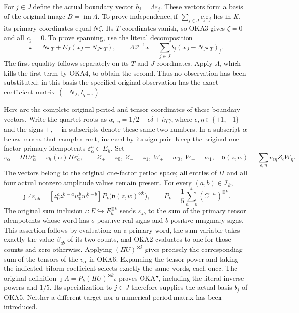 \documentclass[11pt,a4paper]{article}
\begin{document}
For $j\in J$ define the actual boundary vector
$b_j=\Lambda\varepsilon_j$. These vectors form a basis of
the original image $B=\operatorname{im}\Lambda$. To prove
independence, if $\sum_{j\in J}c_j\varepsilon_j$ lies in
$K$, its primary coordinates equal $N\zeta$. Its $T$
coordinates vanish, so OKA3 gives $\zeta=0$ and all $c_j=0$.
To prove spanning, use the literal decomposition
\[
 x=N x_T+E_J(x_J-N_Jx_T),\qquad
 \Lambda\mathcal V^{-1}x
       =\sum_{j\in J}b_j(x_J-N_Jx_T)_j.
 \tag{OKA5}
\]
The first equality follows separately on its $T$ and $J$
coordinates. Apply $\Lambda$, which kills the first term by
OKA4, to obtain the second. Thus no observation has been
substituted: in this basis the specified original observation
has the exact coefficient matrix $(-N_J,I_{q-r})$.

Here are the complete original period and tensor coordinates of
these boundary vectors. Write the quartet roots as
$\alpha_{\epsilon,\eta}=1/2+\epsilon\delta+i\eta\gamma$,
where $\epsilon,\eta\in\{+1,-1\}$ and the signs $+,-$ in
subscripts denote these same two numbers. In a subscript
$\alpha$ below means that complex root, indexed by its sign
pair. Keep the original one-factor primary idempotents
$\varepsilon^h_\alpha\in E_h$. Set
\[
 v_\alpha=\Pi U\varepsilon^h_\alpha
       =v_h(\alpha)\Pi\varepsilon^h_\alpha,
 \qquad
 Z_+=z_0,\ Z_-=z_1,\ W_+=w_0,\ W_-=w_1,
 \quad
 \mathfrak v(z,w)=\sum_{\epsilon,\eta}
                         v_{\epsilon\eta}Z_\epsilon W_\eta.
 \tag{OKA6}
\]
The vectors belong to the original one-factor period space;
all entries of $\Pi$ and all four actual nonzero amplitude
values remain present. For every $(a,b)\in\mathcal I_k$,
\[
 \boxed{\quad
 \jmath\Lambda\varepsilon_{ab}
  =[z_0^a z_1^{k-a}w_0^b w_1^{k-b}]
       P_k\bigl(\mathfrak v(z,w)^{\otimes k}\bigr),\qquad
 P_k=\frac15\sum_{h=0}^4(C^{-h})^{\otimes k}.
 \quad}\tag{OKA7}
\]
The original sum inclusion $\iota:E\hookrightarrow E_h^{\otimes k}$
sends $\varepsilon_{ab}$ to the sum of the primary tensor
idempotents whose word has $a$ positive real signs and $b$
positive imaginary signs. This assertion follows by evaluation:
on a primary word, the sum variable takes exactly the value
$\beta_{ab}$ of its two counts, and OKA2 evaluates to one
for those counts and zero otherwise. Applying
$(\Pi U)^{\otimes k}$ gives precisely the corresponding sum
of the tensors of the $v_\alpha$ in OKA6. Expanding the tensor
power and taking the indicated biform coefficient selects
exactly the same words, each once. The original definition
$\jmath\Lambda=P_k(\Pi U)^{\otimes k}\iota$ proves OKA7,
including the literal inverse powers and $1/5$. Its specialization
to $j\in J$ therefore supplies the actual basis $b_j$ of
OKA5. Neither a different target nor a numerical period matrix
has been introduced.
\end{document}
